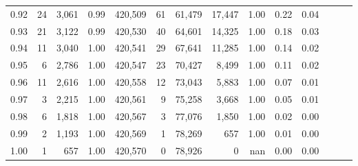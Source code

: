 \begin{tabular}{rrrrrrrrrrrrrr}
0.92 &     24 &  3,061 &  0.99 &  420,509 &       61 &  61,479 &  17,447 &  1.00 &  0.22 &      0.04 \\
0.93 &     21 &  3,122 &  0.99 &  420,530 &       40 &  64,601 &  14,325 &  1.00 &  0.18 &      0.03 \\
0.94 &     11 &  3,040 &  1.00 &  420,541 &       29 &  67,641 &  11,285 &  1.00 &  0.14 &      0.02 \\
0.95 &      6 &  2,786 &  1.00 &  420,547 &       23 &  70,427 &   8,499 &  1.00 &  0.11 &      0.02 \\
0.96 &     11 &  2,616 &  1.00 &  420,558 &       12 &  73,043 &   5,883 &  1.00 &  0.07 &      0.01 \\
0.97 &      3 &  2,215 &  1.00 &  420,561 &        9 &  75,258 &   3,668 &  1.00 &  0.05 &      0.01 \\
0.98 &      6 &  1,818 &  1.00 &  420,567 &        3 &  77,076 &   1,850 &  1.00 &  0.02 &      0.00 \\
0.99 &      2 &  1,193 &  1.00 &  420,569 &        1 &  78,269 &     657 &  1.00 &  0.01 &      0.00 \\
1.00 &      1 &    657 &  1.00 &  420,570 &        0 &  78,926 &       0 &   nan &  0.00 &      0.00 \\
\bottomrule
\end{tabular}
